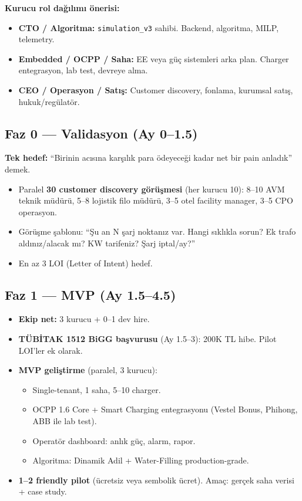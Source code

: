 \documentclass[11pt,a4paper]{article}
\begin{document}
\textbf{Kurucu rol dağılımı önerisi:}
\begin{itemize}
    \item \textbf{CTO / Algoritma:} \texttt{simulation\_v3} sahibi. Backend, algoritma, MILP, telemetry.
    \item \textbf{Embedded / OCPP / Saha:} EE veya güç sistemleri arka plan. Charger entegrasyon, lab test, devreye alma.
    \item \textbf{CEO / Operasyon / Satış:} Customer discovery, fonlama, kurumsal satış, hukuk/regülatör.
\end{itemize}

\subsection{Faz 0 --- Validasyon (Ay 0--1.5)}
\textbf{Tek hedef:} ``Birinin acısına karşılık para ödeyeceği kadar net bir pain anladık'' demek.
\begin{itemize}
    \item Paralel \textbf{30 customer discovery görüşmesi} (her kurucu 10): 8--10 AVM teknik müdürü, 5--8 lojistik filo müdürü, 3--5 otel facility manager, 3--5 CPO operasyon.
    \item Görüşme şablonu: ``Şu an N şarj noktanız var. Hangi sıklıkla sorun? Ek trafo aldınız/alacak mı? KW tarifeniz? Şarj iptal/ay?''
    \item En az 3 LOI (Letter of Intent) hedef.
\end{itemize}

\subsection{Faz 1 --- MVP (Ay 1.5--4.5)}
\begin{itemize}
    \item \textbf{Ekip net:} 3 kurucu + 0--1 dev hire.
    \item \textbf{TÜBİTAK 1512 BiGG başvurusu} (Ay 1.5--3): 200K TL hibe. Pilot LOI'ler ek olarak.
    \item \textbf{MVP geliştirme} (paralel, 3 kurucu):
        \begin{itemize}
            \item Single-tenant, 1 saha, 5--10 charger.
            \item OCPP 1.6 Core + Smart Charging entegrasyonu (Vestel Bonus, Phihong, ABB ile lab test).
            \item Operatör dashboard: anlık güç, alarm, rapor.
            \item Algoritma: Dinamik Adil + Water-Filling production-grade.
        \end{itemize}
    \item \textbf{1--2 friendly pilot} (ücretsiz veya sembolik ücret). Amaç: gerçek saha verisi + case study.
\end{itemize}
\end{document}
